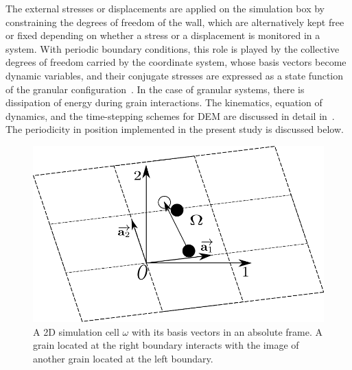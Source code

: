 The external stresses or displacements are applied on the simulation box by 
constraining the degrees of freedom of the wall, which are alternatively kept 
free or fixed depending on whether a stress or a displacement is monitored in a 
system. With periodic boundary conditions, this role is played by the 
collective degrees of freedom carried by the coordinate system, whose basis 
vectors become dynamic variables, and their conjugate stresses are expressed as 
a state function of the granular configuration~\citep{Parrinello1980}. In the 
case of granular systems, there is dissipation of energy during grain 
interactions. The kinematics, equation of dynamics, and the time-stepping 
schemes for DEM are discussed in detail 
in~\citet{Voiv2011}. The periodicity in position implemented in the present 
study is discussed below. 
%
\begin{figure}[htbp]
\centering
\includegraphics[scale=0.65]{periodic}
\caption[A 2D periodic simulation cell $\omega$ with its basis vectors in an 
absolute frame]{A 2D simulation cell $\omega$ with its basis vectors in an 
absolute 
frame. A grain located at the right boundary interacts with the image of 
another grain located at the left boundary.}
\label{fig:periodic}
\end{figure}

